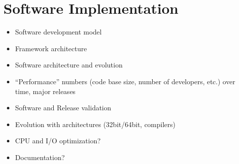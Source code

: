 \section{Software Implementation}
\begin{itemize}

\item Software development model

\item Framework architecture 

\item Software architecture and evolution

\item ``Performance'' numbers (code base size, number of developers, etc.) 
over time, major releases


\item Software and Release validation


\item Evolution with architectures (32bit/64bit, compilers)

\item CPU and I/O optimization?

\item Documentation?

\end{itemize}


